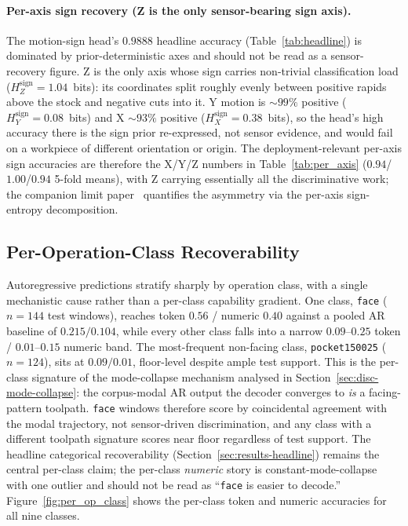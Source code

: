 \documentclass[sensors,article,submit,moreauthors,pdftex]{Definitions/mdpi}
\begin{document}
\paragraph{Per-axis sign recovery (Z is the only sensor-bearing sign axis).} The motion-sign head's $0.9888$ headline accuracy (Table~\ref{tab:headline}) is dominated by prior-deterministic axes and should not be read as a sensor-recovery figure. Z is the only axis whose sign carries non-trivial classification load ($H_{Z}^{\text{sign}}\!=\!1.04$~bits): its coordinates split roughly evenly between positive rapids above the stock and negative cuts into it. Y motion is $\sim\!99\%$ positive ($H_{Y}^{\text{sign}}\!=\!0.08$~bits) and X $\sim\!93\%$ positive ($H_{X}^{\text{sign}}\!=\!0.38$~bits), so the head's high accuracy there is the sign prior re-expressed, not sensor evidence, and would fail on a workpiece of different orientation or origin. The deployment-relevant per-axis sign accuracies are therefore the X/Y/Z numbers in Table~\ref{tab:per_axis} ($0.94$/$1.00$/$0.94$ 5-fold means), with Z carrying essentially all the discriminative work; the companion limit paper~\cite{paperB_entropy} quantifies the asymmetry via the per-axis sign-entropy decomposition.

\subsection{Per-Operation-Class Recoverability}
\label{sec:per-op-class}

Autoregressive predictions stratify sharply by operation class, with a single mechanistic cause rather than a per-class capability gradient. One class, \texttt{face} ($n=144$ test windows), reaches token $0.56$ / numeric $0.40$ against a pooled AR baseline of $0.215 / 0.104$, while every other class falls into a narrow $0.09$--$0.25$ token / $0.01$--$0.15$ numeric band. The most-frequent non-facing class, \texttt{pocket150025} ($n=124$), sits at $0.09 / 0.01$, floor-level despite ample test support. This is the per-class signature of the mode-collapse mechanism analysed in Section~\ref{sec:disc-mode-collapse}: the corpus-modal AR output the decoder converges to \emph{is} a facing-pattern toolpath. \texttt{face} windows therefore score by coincidental agreement with the modal trajectory, not sensor-driven discrimination, and any class with a different toolpath signature scores near floor regardless of test support. The headline categorical recoverability (Section~\ref{sec:results-headline}) remains the central per-class claim; the per-class \emph{numeric} story is constant-mode-collapse with one outlier and should not be read as ``\texttt{face} is easier to decode.'' Figure~\ref{fig:per_op_class} shows the per-class token and numeric accuracies for all nine classes.
\end{document}
